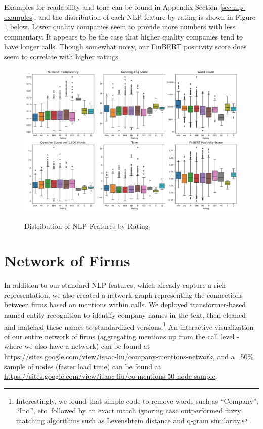 \documentclass{article}[11pt]
\begin{document}
    Examples for readability and tone can be found in Appendix Section \ref{sec:nlp-examples}, and the distribution of each NLP feature by rating is shown in Figure \ref{fig:dist-nlp-by-rating} below. Lower quality companies seem to provide more numbers with less commentary. It appears to be the case that higher quality companies tend to have longer calls. Though somewhat noisy, our FinBERT positivity score does seem to correlate with higher ratings.

    \begin{figure}[h!]
		\centering
        \caption{Distribution of NLP Features by Rating}
        \includegraphics[width=0.6\linewidth,keepaspectratio=true]{../Output/NLP/hist_by_rating.png}
        \label{fig:dist-nlp-by-rating}
	\end{figure}

    \section*{Network of Firms}

    In addition to our standard NLP features, which already capture a rich representation, we also created a network graph representing the connections between firms based on mentions within calls. We deployed transformer-based named-entity recognition \citep{spacy_spacy_2024} to identify company names in the text, then cleaned and matched these names to standardized versions.\footnote{Interestingly, we found that simple code to remove words such as ``Company'', ``Inc.'', etc. followed by an exact match ignoring case outperformed fuzzy matching algorithms such as Levenshtein distance and q-gram similarity.} An interactive visualization of our entire network of firms (aggregating mentions up from the call level - where we also have a network) can be found at \url{https://sites.google.com/view/isaac-liu/company-mentions-network}, and a ~50\% sample of nodes (faster load time) can be found at \url{https://sites.google.com/view/isaac-liu/co-mentions-50-node-sample}.
\end{document}
